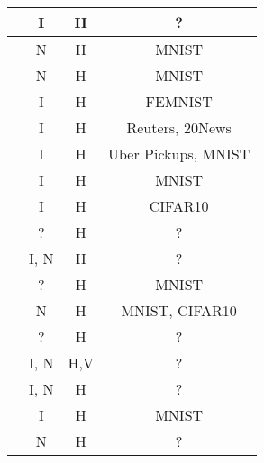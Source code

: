 \begin{table}[ht]
\begin{tabular}{c|c|c|c}
\cite{8733825}                      & I                 & H              & ?                                  \\ \hline
\cite{8893114}                      & N                 & H              & MNIST                              \\ \hline
\cite{9274451}                      & N                 & H              & MNIST                              \\ \hline
\cite{9293091}                      & I                 & H              & FEMNIST                            \\ \hline
\cite{8843900}                      & I                 & H              & Reuters, 20News                    \\ \hline
\cite{8998397}                      & I                 & H              & Uber Pickups, MNIST                \\ \hline
\cite{9311394}                      & I                 & H              & MNIST                              \\ \hline
\cite{9170905}                      & I                 & H              & CIFAR10                            \\ \hline
\cite{10.48550/arxiv.2009.09338}    & ?                 & H              & ?                                  \\ \hline
\cite{8892848}                      & I, N              & H              & ?                                  \\ \hline
\cite{8945913}                      & ?                 & H              & MNIST                              \\ \hline
\cite{10.48550/arxiv.2202.02817}    & N                 & H              & MNIST, CIFAR10                     \\ \hline
\cite{10.48550/arxiv.2007.03856}    & ?                 & H              & ?                                  \\ \hline
\cite{10.48550/arxiv.1912.04859}    & I, N              & H,V            & ?                                  \\ \hline
\cite{10.48550/arxiv.1910.12603}    & I, N              & H              & ?                                  \\ \hline
\cite{9321132}                      & I                 & H              & MNIST                              \\ \hline
\cite{Peyvandi2022}                 & N                 & H              & ?                                  \\ \hline

\end{tabular}
\end{table}
